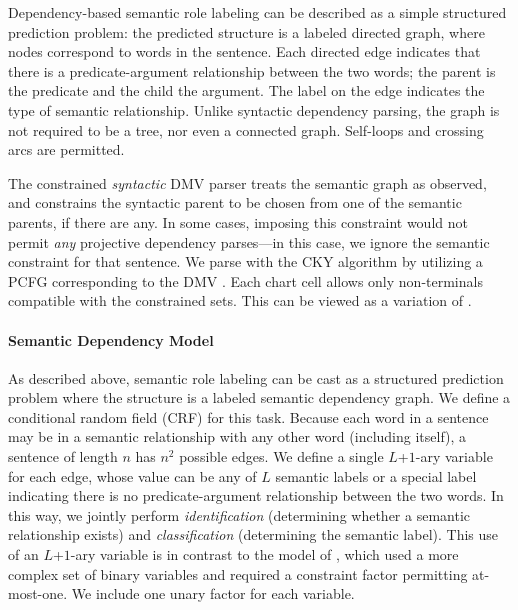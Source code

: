 \documentclass[11pt]{article}
\begin{document}
Dependency-based semantic role labeling can be described as a simple structured
prediction problem: the predicted structure is a labeled directed
graph, where nodes correspond to words in the sentence.  Each directed
edge indicates that there is a predicate-argument relationship between
the two words; the parent is the predicate and the child the
argument. The label on the edge indicates the type of semantic
relationship.
Unlike syntactic dependency parsing, the graph is
not required to be a tree, nor even a connected graph. Self-loops and
crossing arcs are permitted. 

The constrained \emph{syntactic} DMV parser treats the semantic graph as observed,
and constrains the syntactic parent to be chosen from one of the
semantic parents, if there are any. In some cases, imposing this
constraint would not permit \emph{any} projective dependency
parses---in this case, we ignore the semantic constraint for that sentence.
 We parse with the CKY algorithm
\cite{younger_recognition_1967,aho_theory_1972} by utilizing a PCFG
corresponding to the DMV \cite{cohn_inducing_2010}.  Each chart cell
allows only non-terminals compatible with the constrained sets. This
can be viewed as a variation of .

\paragraph{Semantic Dependency Model}
\label{sec:srlOnlyModel}

As described above, semantic role labeling can be cast as a structured
prediction problem where the structure is a labeled semantic
dependency graph. 
We define a conditional random field (CRF)
\cite{lafferty_conditional_2001} for this task.  Because each word in
a sentence may be in a semantic relationship with any other word
(including itself), a sentence of length $n$ has $n^2$ possible edges.
We define a single $L$+$1$-ary variable for each edge, whose value can
be any of $L$ semantic labels or a special label indicating there is
no predicate-argument relationship between the two words. In this way,
we jointly perform \emph{identification} (determining whether a
semantic relationship exists) and \emph{classification} (determining
the semantic label).
This use of an $L$+$1$-ary variable is in contrast to
the model of , which used a
more complex set of binary variables and required a constraint factor permitting
{\sc at-most-one}. We include one unary factor for each variable.
\end{document}
